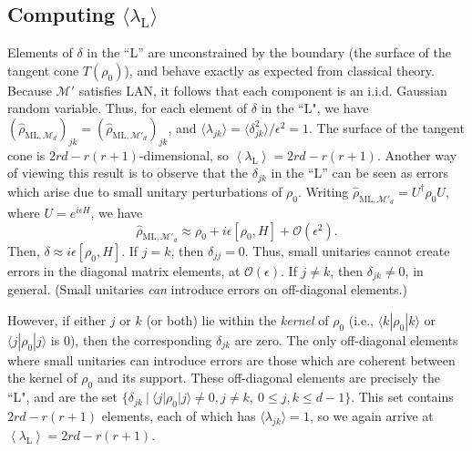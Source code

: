 \documentclass[aps,pra, twocolumn]{revtex4-1}
\newcommand{\M}{\mathcal{M}}
\newcommand{\expect}[1]{\ensuremath{\left\langle#1\right\rangle}}
\newcommand{\rhohat}{\hat{\rho}}
\newcommand{\rhoML}[1]{\rhohat_{\scriptscriptstyle{\mathrm{ML},#1}}}
\begin{document}
\subsection{Computing $\langle \lambda_\mathrm{L}\rangle$}
\label{subsec:L}
Elements of $\delta$ in the ``L'' are unconstrained by the boundary (the surface of the tangent cone $T(\rho_{0})$), and behave exactly as expected from classical theory.  Because $\M'$ satisfies LAN, it follows that each component is an i.i.d. Gaussian random variable. Thus, for each element of $\delta$ in the ``L", we have $(\rhoML{\M_{d}})_{jk} = (\rhoML{\M'_{d}})_{jk}$, and $\langle \lambda_{jk} \rangle = \langle \delta_{jk}^{2}\rangle /\epsilon^{2} = 1$. The surface of the tangent cone is $2rd - r(r+1)$-dimensional, so $\expect{\lambda_{\mathrm{L}}} = 2rd - r(r+1)$.
Another way of viewing this result is to observe that the $\delta_{jk}$ in the ``L'' can be seen as errors which arise due to small unitary perturbations of $\rho_{0}$. Writing $\rhoML{\M'_{d}} = U^{\dagger}\rho_{0}U$, where $U=e^{i\epsilon H}$, we have
\[\rhoML{\M'_{d}} \approx \rho_{0} + i\epsilon [\rho_{0},H]+\mathcal{O}(\epsilon^{2}).\]
Then, $\delta \approx i\epsilon [\rho_{0},H]$.
If $j = k$, then $\delta_{jj} = 0$. Thus, small unitaries cannot create errors in the diagonal matrix elements, at $\mathcal{O}(\epsilon)$. If $j \neq k$, then $\delta_{jk} \neq 0$, in general. (Small unitaries \emph{can} introduce errors on off-diagonal elements.)

However, if either $j$ or $k$ (or both) lie within the \emph{kernel} of $\rho_{0}$ (i.e., $\langle k | \rho_{0}| k \rangle$ or $\langle j|\rho_{0}|j\rangle$ is 0), then the corresponding $\delta_{jk}$ are zero. The only off-diagonal elements where small unitaries can introduce errors are those which are coherent between the kernel of $\rho_{0}$ and its support. These off-diagonal elements are precisely the ``L", and are  the set $\{\delta_{jk}~|~\langle j | \rho_{0}|j\rangle \neq 0, j\neq k, ~ 0 \leq j,k \leq d - 1\}$. This set contains $2rd - r(r+1)$ elements, each of which has $\langle \lambda_{jk}\rangle = 1$, so we again arrive at $\expect{\lambda_{\mathrm{L}}} = 2rd - r(r+1)$.
\end{document}

